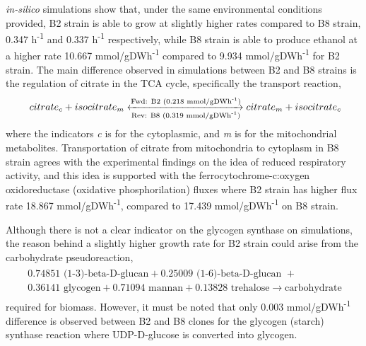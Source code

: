 \emph{in-silico} simulations show that, under the same environmental conditions provided, B2 strain is able to grow at slightly higher rates compared to B8 strain, 0.347 h\textsuperscript{-1} and 0.337 h\textsuperscript{-1} respectively, while B8 strain is able to produce ethanol at a higher rate 10.667 mmol/gDWh\textsuperscript{-1} compared to 9.934 mmol/gDWh\textsuperscript{-1} for B2 strain. The main difference observed in simulations between B2 and B8 strains is the regulation of citrate in the TCA cycle, specifically the transport reaction,
\begin{align}
\label{eq:citratetransport}
\ citrate_c + isocitrate_m \xleftrightarrow[\text{Rev: B8 (0.319 mmol/gDWh\textsuperscript{-1})}]{\text{Fwd: B2 (0.218 mmol/gDWh\textsuperscript{-1})}} citrate_m + isocitrate_c
\end{align}
\noindent where the indicators \emph{c} is for the cytoplasmic, and \emph{m} is for the mitochondrial metabolites. Transportation of citrate from mitochondria to cytoplasm in B8 strain agrees with the experimental findings on the idea of reduced respiratory activity, and this idea is supported with the ferrocytochrome-c:oxygen oxidoreductase (oxidative phosphorilation) fluxes where B2 strain has higher flux rate 18.867 mmol/gDWh\textsuperscript{-1}, compared to 17.439 mmol/gDWh\textsuperscript{-1} on B8 strain.

Although there is not a clear indicator on the glycogen synthase on simulations, the reason behind a slightly higher growth rate for B2 strain could arise from the carbohydrate pseudoreaction,
\begin{align}
\begin{split}
\  0.74851 \text{ (1-3)-beta-D-glucan} + 0.25009 \text{ (1-6)-beta-D-glucan } + \\
\ 0.36141 \text{ glycogen} + 0.71094 \text{ mannan} + 0.13828 \text{ trehalose} \xrightarrow{}  \text{carbohydrate}
\end{split}
\end{align}
required for biomass. However, it must be noted that only 0.003 mmol/gDWh\textsuperscript{-1} difference is observed between B2 and B8 clones for the glycogen (starch) synthase reaction where UDP-D-glucose is converted into glycogen.

